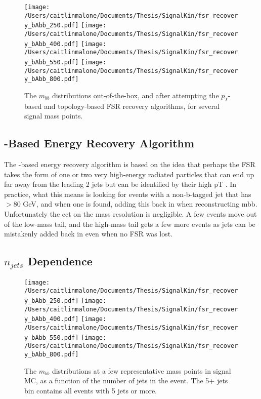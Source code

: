 \begin{figure}[hbt]
  \texttt{[image: /Users/caitlinmalone/Documents/Thesis/SignalKin/fsr\_recovery\_bAbb\_250.pdf]}
  \texttt{[image: /Users/caitlinmalone/Documents/Thesis/SignalKin/fsr\_recovery\_bAbb\_400.pdf]}
\newline
  \texttt{[image: /Users/caitlinmalone/Documents/Thesis/SignalKin/fsr\_recovery\_bAbb\_550.pdf]}
  \texttt{[image: /Users/caitlinmalone/Documents/Thesis/SignalKin/fsr\_recovery\_bAbb\_800.pdf]}
  \label{fig:fsr_recovery}
  \caption{The $m_{bb}$ distributions out-of-the-box, and after attempting the $p_T$-based and topology-based FSR recovery algorithms, for several signal mass points.}
\end{figure}



\subsection{\pt-Based Energy Recovery Algorithm}
The \pt-based energy recovery algorithm is based on the idea that perhaps the FSR takes the form of one
 or two very high-energy radiated particles that can end up far away from the leading 2 jets but can be
 identified by their high pT . In practice, what this means is looking for events with a non-b-tagged jet that
 has \pt$>$80 GeV, and when one is found, adding this back in when reconstructing mbb.
 Unfortunately the ect on the mass resolution is negligible. A few events move out of the low-mass
 tail, and the high-mass tail gets a few more events as jets can be mistakenly added back in even when no
 FSR was lost.

\subsection{$n_{jets}$ Dependence} 
\begin{figure}[hbt]
  \texttt{[image: /Users/caitlinmalone/Documents/Thesis/SignalKin/fsr\_recovery\_bAbb\_250.pdf]}
  \texttt{[image: /Users/caitlinmalone/Documents/Thesis/SignalKin/fsr\_recovery\_bAbb\_400.pdf]}
\newline
  \texttt{[image: /Users/caitlinmalone/Documents/Thesis/SignalKin/fsr\_recovery\_bAbb\_550.pdf]}
  \texttt{[image: /Users/caitlinmalone/Documents/Thesis/SignalKin/fsr\_recovery\_bAbb\_800.pdf]}
  \label{fig:mbb_njets_signal}
  \caption{The $m_{bb}$ distributions at a few representative mass points in signal MC, as a function of the number of jets in the event.  
    The 5+ jets bin contains all events with 5 jets or more.}
\end{figure}

